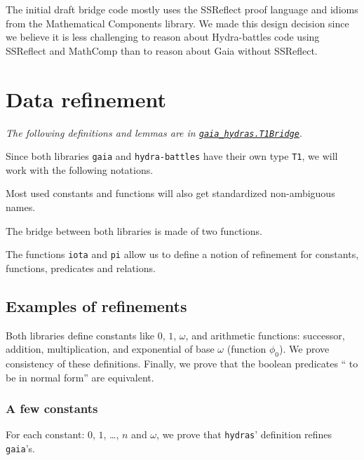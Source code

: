 The initial draft bridge code mostly uses the SSReflect proof language
and idioms from the Mathematical Components library. We made this design
decision since we believe it is less challenging to reason about
Hydra-battles code using SSReflect and MathComp than to reason about
Gaia without SSReflect.

\section{Data refinement}

\emph{The following definitions and lemmas are in
\href{../theories/html/gaia_hydras.T1Bridge.html}%
{\texttt{gaia\_hydras.T1Bridge}}}.

Since both libraries \texttt{gaia} and \texttt{hydra-battles} have their own type \texttt{T1}, we will work with the following notations.


Most used constants and functions will also get standardized
non-ambiguous names.





The bridge between both libraries is made of two functions.



The functions \texttt{iota} and \texttt{pi} allow us to define
a notion of refinement for constants, functions, predicates and relations.


\subsection{Examples of refinements}
Both libraries define constants like $0$, $1$, $\omega$, and arithmetic functions: successor, addition, multiplication, and exponential of base $\omega$ (function $\phi_0$). We prove consistency of these definitions. Finally, we prove that the boolean predicates `` to be in normal form'' are equivalent.

\subsubsection{A few constants}
For each constant: $0$, $1$, \dots, $n$ and $\omega$, we prove
that \texttt{hydras}' definition refines \texttt{gaia}'s.

